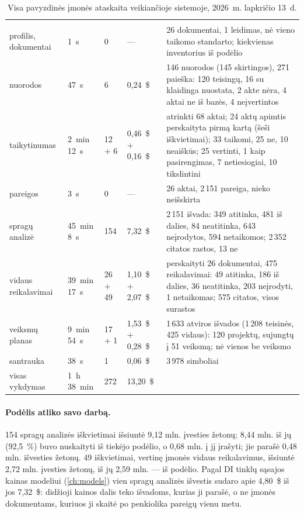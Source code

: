 \begin{xltabular}{\textwidth}{@{}L{23mm}R{18mm}R{13mm}R{23mm}Y@{}}
\caption{Visa pavyzdinės įmonės ataskaita veikiančioje sistemoje, 2026~m. lapkričio
13~d.}\label{tab:report:run}\\
\toprule
{} &  &  &  &  \\
\midrule
\endfirsthead
\toprule
{} &  &  &  &  \\
\midrule
\endhead
\bottomrule
\endlastfoot
profilis, dokumentai & 1~s & 0 & --- & 26 dokumentai, 1 leidimas, nė vieno taikomo standarto; kiekvienas inventorius iš podėlio \\
nuorodos & 47~s & 6 & 0,24~\$ & 146 nuorodos (145 skirtingos), 271 paieška: 120 teisingų, 16 su klaidinga nuostata, 2 akte nėra, 4 aktai ne iš bazės, 4 neįvertintos \\
taikytinumas & 2~min 12~s & 12 + 6 & 0,46~\$ + 0,16~\$ & atrinkti 68 aktai; 24 aktų apimtis perskaityta pirmą kartą (šeši iškvietimai); 33 taikomi, 25 ne, 10 neaiškūs; 25 vertinti, 1 kaip pasirengimas, 7 netiesiogiai, 10 tikslintini \\
pareigos & 3~s & 0 & --- & 26 aktai, 2\,151 pareiga, nieko neišskirta \\
spragų analizė & 45~min 8~s & 154 & 7,32~\$ & 2\,151 išvada: 349 atitinka, 481 iš dalies, 84 neatitinka, 643 neįrodytos, 594 netaikomos; 2\,352 citatos rastos, 13 ne \\
vidaus reikalavimai & 39~min 17~s & 26 + 49 & 1,10~\$ + 2,07~\$ & perskaityti 26 dokumentai, 475 reikalavimai: 49 atitinka, 186 iš dalies, 36 neatitinka, 203 neįrodyti, 1 netaikomas; 575 citatos, visos surastos \\
veiksmų planas & 9~min 54~s & 17 + 1 & 1,53~\$ + 0,28~\$ & 1\,633 atviros išvados (1\,208 teisinės, 425 vidaus): 120 projektų, sujungtų į 51 veiksmą; nė vienos be veiksmo \\
santrauka & 38~s & 1 & 0,06~\$ & 3\,978 simboliai \\
\midrule
visas vykdymas & 1~h 38~min & 272 & 13,20~\$ & \\
\end{xltabular}

\paragraph{Podėlis atliko savo darbą.} 154 spragų analizės iškvietimai išsiuntė 9,12 mln.
įvesties žetonų; 8,44 mln. iš jų (92,5~\%) buvo nuskaityti iš tiekėjo podėlio, o 0,68 mln. į jį
įrašyti; jie parašė 0,48 mln. išvesties žetonų. 49 iškvietimai, vertinę įmonės vidaus
reikalavimus, išsiuntė 2,72 mln. įvesties žetonų, iš jų 2,59 mln. --- iš podėlio. Pagal DI tinklų
sąsajos kainas modeliui  (\cref{ch:models}) vien spragų analizės išvestis
sudaro apie 4,80~\$ iš jos 7,32~\$: didžioji kainos dalis teko išvadoms, kurias ji parašė, o ne
įmonės dokumentams, kuriuos ji skaitė po penkiolika pareigų vienu metu.

